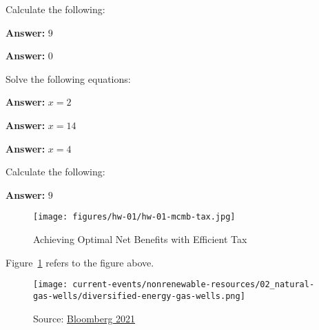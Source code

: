 \begin{enumerate}
\begin{Exercise}{Calculate the following:}
     \begin{sol}
         \textbf{Answer:} $9$
     \end{sol}
     
     
      \begin{sol}
         \textbf{Answer:}  $0$
      \end{sol}
\end{Exercise}

\begin{Exercise}{Solve the following equations:}
      \begin{sol}
       \textbf{Answer:}  $x=2$
     \end{sol}
     
     
    \begin{sol}
    \textbf{Answer:} $x=14$
    \end{sol}
    
    
    \begin{sol}
    \textbf{Answer:} $x=4$
         
    \end{sol}
    

    

\end{Exercise}



\begin{Exercise}{Calculate the following:}
     \begin{sol}
         \textbf{Answer:} $9$
     \end{sol}
     
     \end{Exercise}

\end{enumerate}



    \begin{figure}[H]
	\centering %
	\texttt{[image: figures/hw-01/hw-01-mcmb-tax.jpg]}
	\caption{Achieving Optimal Net Benefits with Efficient Tax} %
	\label{fig:ps01efficienttax}
    \end{figure}

    Figure~\ref{fig:ps01efficienttax} refers to the figure above.

 \begin{figure}
        \centering
        \texttt{[image: current-events/nonrenewable-resources/02\_natural-gas-wells/diversified-energy-gas-wells.png]}
        \begin{minipage}{.5\textwidth}
         \footnotesize Source: \href{https://www.bloomberg.com/features/diversified-energy-natural-gas-wells-methane-leaks-2021/?sref=1kJVNqnU}{Bloomberg 2021}
        \end{minipage} 
    \end{figure}